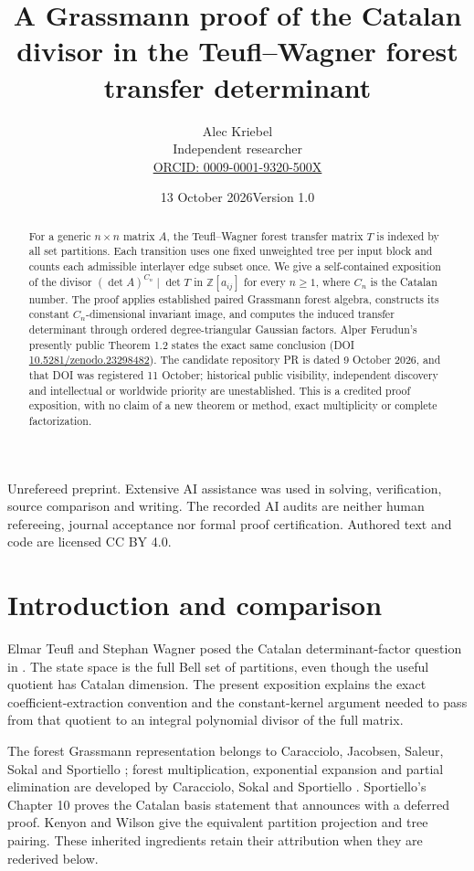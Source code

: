 \documentclass[11pt]{article}
\title{A Grassmann proof of the Catalan divisor in the Teufl--Wagner forest transfer determinant}
\author{Alec Kriebel\\Independent researcher\\\small\href{https://orcid.org/0009-0001-9320-500X}{ORCID: 0009-0001-9320-500X}}
\date{13 October 2026\quad Version 1.0}
\begin{document}
\maketitle
\begin{abstract}
For a generic $n\times n$ matrix $A$, the Teufl--Wagner forest transfer matrix $T$ is indexed by all set partitions. Each transition uses one fixed unweighted tree per input block and counts each admissible interlayer edge subset once. We give a self-contained exposition of the divisor $(\det A)^{C_n}\mid\det T$ in $\mathbb Z[a_{ij}]$ for every $n\geq1$, where $C_n$ is the Catalan number. The proof applies established paired Grassmann forest algebra, constructs its constant $C_n$-dimensional invariant image, and computes the induced transfer determinant through ordered degree-triangular Gaussian factors. Alper Ferudun's presently public Theorem 1.2 states the exact same conclusion (DOI \href{https://doi.org/10.5281/zenodo.23298482}{10.5281/zenodo.23298482}). The candidate repository PR is dated 9 October 2026, and that DOI was registered 11 October; historical public visibility, independent discovery and intellectual or worldwide priority are unestablished. This is a credited proof exposition, with no claim of a new theorem or method, exact multiplicity or complete factorization.
\end{abstract}
\begin{center}\small
Unrefereed preprint. Extensive AI assistance was used in solving, verification, source comparison and writing. The recorded AI audits are neither human refereeing, journal acceptance nor formal proof certification. Authored text and code are licensed CC BY 4.0.
\end{center}

\section*{Introduction and comparison}
Elmar Teufl and Stephan Wagner posed the Catalan determinant-factor question in \cite[Problem 1, pp.~1457--1458]{TW}. The state space is the full Bell set of partitions, even though the useful quotient has Catalan dimension. The present exposition explains the exact coefficient-extraction convention and the constant-kernel argument needed to pass from that quotient to an integral polynomial divisor of the full matrix.

The forest Grassmann representation belongs to Caracciolo, Jacobsen, Saleur, Sokal and Sportiello \cite{CJSSS}; forest multiplication, exponential expansion and partial elimination are developed by Caracciolo, Sokal and Sportiello \cite{CSS}. Sportiello's Chapter 10 \cite{Sportiello} proves the Catalan basis statement that \cite{CSS} announces with a deferred proof. Kenyon and Wilson \cite{KW} give the equivalent partition projection and tree pairing. These inherited ingredients retain their attribution when they are rederived below.
\end{document}
